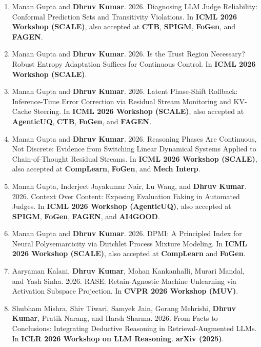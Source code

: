 \documentclass[10pt, a4paper]{article}
\begin{document}
\begin{enumerate}[label=\textbf{W\arabic*.}, leftmargin=2.8em, itemsep=0.3em]
\item Manan Gupta and \textbf{Dhruv Kumar}. 2026. Diagnosing LLM Judge Reliability: Conformal Prediction Sets and Transitivity Violations. In \textbf{ICML 2026 Workshop (SCALE)}, also accepted at \textbf{CTB}, \textbf{SPIGM}, \textbf{FoGen}, and \textbf{FAGEN}.

\item Manan Gupta and \textbf{Dhruv Kumar}. 2026. Is the Trust Region Necessary? Robust Entropy Adaptation Suffices for Continuous Control. In \textbf{ICML 2026 Workshop (SCALE)}.

\item Manan Gupta and \textbf{Dhruv Kumar}. 2026. Latent Phase-Shift Rollback: Inference-Time Error Correction via Residual Stream Monitoring and KV-Cache Steering. In \textbf{ICML 2026 Workshop (SCALE)}, also accepted at \textbf{AgenticUQ}, \textbf{CTB}, \textbf{FoGen}, and \textbf{FAGEN}.

\item Manan Gupta and \textbf{Dhruv Kumar}. 2026. Reasoning Phases Are Continuous, Not Discrete: Evidence from Switching Linear Dynamical Systems Applied to Chain-of-Thought Residual Streams. In \textbf{ICML 2026 Workshop (SCALE)}, also accepted at \textbf{CompLearn}, \textbf{FoGen}, and \textbf{Mech Interp}.

\item Manan Gupta, Inderjeet Jayakumar Nair, Lu Wang, and \textbf{Dhruv Kumar}. 2026. Context Over Content: Exposing Evaluation Faking in Automated Judges. In \textbf{ICML 2026 Workshop (AgenticUQ)}, also accepted at \textbf{SPIGM}, \textbf{FoGen}, \textbf{FAGEN}, and \textbf{AI4GOOD}.

\item Manan Gupta and \textbf{Dhruv Kumar}. 2026. DPMI: A Principled Index for Neural Polysemanticity via Dirichlet Process Mixture Modeling. In \textbf{ICML 2026 Workshop (SCALE)}, also accepted at \textbf{CompLearn} and \textbf{FoGen}.

\item Aaryaman Kalani, \textbf{Dhruv Kumar}, Mohan Kankanhalli, Murari Mandal, and Yash Sinha. 2026. RASE: Retain-Agnostic Machine Unlearning via Activation Subspace Projection. In \textbf{CVPR 2026 Workshop (MUV)}.

\item Shubham Mishra, Shiv Tiwari, Samyek Jain, Gorang Mehrishi, \textbf{Dhruv Kumar}, Pratik Narang, and Harsh Sharma. 2026. From Facts to Conclusions: Integrating Deductive Reasoning in Retrieval-Augmented LLMs. In \textbf{ICLR 2026 Workshop on LLM Reasoning}. \textbf{arXiv (2025)}.


\end{enumerate}
\end{document}
